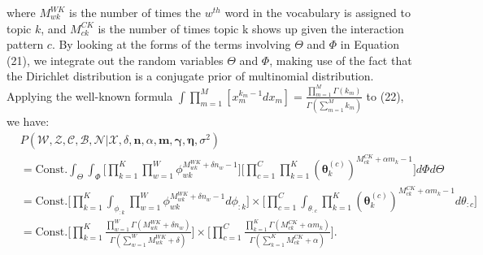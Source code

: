 \documentclass[a4paper]{article}
\begin{document}
where $M^{WK}_{wk}$ is the number of times the $w^{th}$ word in the vocabulary is assigned to topic $k$, and $M^{CK}_{ck}$ is the number of times topic k shows up given the interaction pattern $c$. By looking at the forms of the terms involving  $\Theta$ and $\Phi$ in Equation (21), we integrate out the random variables $\Theta$ and $\Phi$, making use of the fact that the Dirichlet distribution is a conjugate prior of multinomial distribution. Applying the well-known formula $\int\prod_{m=1}^{M}[x_m^{k_m-1}dx_m]=\frac{\prod_{m=1}^M\Gamma(k_m)}{\Gamma(\sum_{m=1}^Mk_m)}$ to (22), we have:
\begin{equation}
\begin{aligned}
&P(\mathcal{W}, \mathcal{Z}, \mathcal{C}, \mathcal{B}, \mathcal{N}| \mathcal{X}, \delta, \boldsymbol{n}, \alpha, \boldsymbol{m}, \boldsymbol{\gamma}, \boldsymbol{\eta}, \sigma^2)\\&=\mbox{Const.}\int_{\Theta}\int_{\Phi}\Big[\prod_{k=1}^{K}\prod_{w=1}^{W}\phi_{wk}^{M^{WK}_{wk}+\delta n_w-1}\Big]\Big[\prod_{c=1}^{C}\prod_{k=1}^{K}(\boldsymbol{\theta}^{(c)}_{k})^{M^{CK}_{ck}+\alpha m_k-1}\Big]d\Phi d\Theta
\\&=\mbox{Const.}\Big[\prod_{k=1}^{K}\int_{\phi_{:k}}\prod_{w=1}^{W}\phi_{wk}^{M^{WK}_{wk}+\delta n_w-1  }d\phi_{:k}\Big]\times\Big[\prod_{c=1}^{C}\int_{\theta_{:c}}\prod_{k=1}^{K}(\boldsymbol{\theta}^{(c)}_{k})^{M^{CK}_{ck}+\alpha m_k-1}d\theta_{:c}\Big]
\\&=\mbox{Const.}\Big[\prod_{k=1}^{K}\frac{\prod_{w=1}^W\Gamma(M_{wk}^{WK}+\delta n_w)}{\Gamma(\sum_{w=1}^WM_{wk}^{WK}+\delta )}\Big]\times\Big[\prod_{c=1}^{C}\frac{\prod_{k=1}^K\Gamma(M^{CK}_{ck}+\alpha m_k)}{\Gamma(\sum_{k=1}^KM^{CK}_{ck}+\alpha)}\Big].
\end{aligned}
\end{equation}
\end{document}
